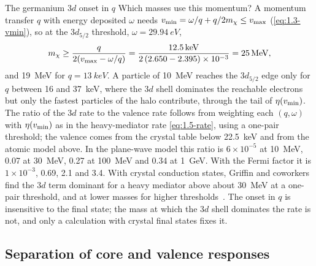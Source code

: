 \begin{workedexample}{The germanium $3d$ onset in $q$}
Which masses use this momentum? A momentum transfer $q$ with energy deposited $\omega$ needs $v_{\mathrm{min}} = \omega/q + q/2m_{\chi} \le v_{\mathrm{max}}$ (\cref{eq:1.3-vmin}), so at the $3d_{5/2}$ threshold, $\omega = \SI{29.94}{eV}$,
\begin{equation*}
  m_{\chi} \ge \frac{q}{2(v_{\mathrm{max}} - \omega/q)} = \frac{\SI{12.5}{keV}}{2\,(2.650 - 2.395)\times10^{-3}} = \SI{25}{MeV} ,
\end{equation*}
and \SI{19}{MeV} for $q = \SI{13}{keV}$. A particle of \SI{10}{MeV} reaches the $3d_{5/2}$ edge only for $q$ between 16 and \SI{37}{keV}, where the $3d$ shell dominates the reachable electrons but only the fastest particles of the halo contribute, through the tail of $\eta(v_{\mathrm{min}})$. The ratio of the $3d$ rate to the valence rate follows from weighting each $(q,\omega)$ with $\eta(v_{\mathrm{min}})$ as in the heavy-mediator rate \cref{eq:1.5-rate}, using a one-pair threshold; the valence comes from the crystal table below \SI{22.5}{keV} and from the atomic model above. In the plane-wave model this ratio is $6\times10^{-5}$ at \SI{10}{MeV}, 0.07 at \SI{30}{MeV}, 0.27 at \SI{100}{MeV} and 0.34 at \SI{1}{GeV}. With the Fermi factor it is $1\times10^{-3}$, 0.69, 2.1 and 3.4. With crystal conduction states, Griffin and coworkers find the $3d$ term dominant for a heavy mediator above about \SI{30}{MeV} at a one-pair threshold, and at lower masses for higher thresholds~\cite[Sect.~4.1]{griffin2021extended}. The onset in $q$ is insensitive to the final state; the mass at which the $3d$ shell dominates the rate is not, and only a calculation with crystal final states fixes it.
\end{workedexample}

\subsection{Separation of core and valence responses}\label{sec:10.6-factor}

